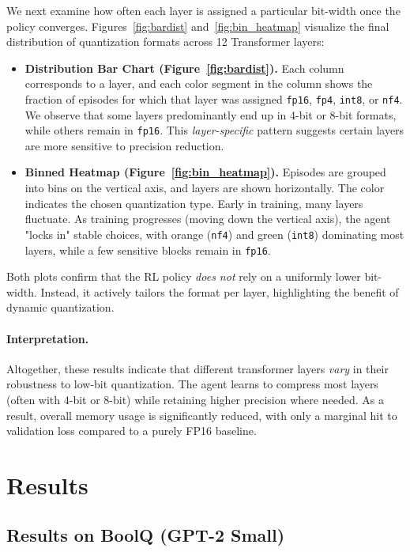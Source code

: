 \documentclass{article}
\begin{document}
	We next examine how often each layer is assigned a particular bit-width once the policy converges. Figures~\ref{fig:bardist} and~\ref{fig:bin_heatmap} visualize the final distribution of quantization formats across 12 Transformer layers:
	\begin{itemize}
		\item \textbf{Distribution Bar Chart (Figure~\ref{fig:bardist}).} Each column corresponds to a layer, and each color segment in the column shows the fraction of episodes for which that layer was assigned \texttt{fp16}, \texttt{fp4}, \texttt{int8}, or \texttt{nf4}. We observe that some layers predominantly end up in 4-bit or 8-bit formats, while others remain in \texttt{fp16}. This \emph{layer-specific} pattern suggests certain layers are more sensitive to precision reduction.
		\item \textbf{Binned Heatmap (Figure~\ref{fig:bin_heatmap}).} Episodes are grouped into bins on the vertical axis, and layers are shown horizontally. The color indicates the chosen quantization type. Early in training, many layers fluctuate. As training progresses (moving down the vertical axis), the agent "locks in" stable choices, with orange (\texttt{nf4}) and green (\texttt{int8}) dominating most layers, while a few sensitive blocks remain in \texttt{fp16}.
	\end{itemize}
	Both plots confirm that the RL policy \emph{does not} rely on a uniformly lower bit-width. Instead, it actively tailors the format per layer, highlighting the benefit of dynamic quantization.
	
	\paragraph{Interpretation.}
	Altogether, these results indicate that different transformer layers \emph{vary} in their robustness to low-bit quantization. The agent learns to compress most layers (often with 4-bit or 8-bit) while retaining higher precision where needed. As a result, overall memory usage is significantly reduced, with only a marginal hit to validation loss compared to a purely FP16 baseline.
			
	
	\section{Results}
	
	\subsection{Results on BoolQ (GPT-2 Small)}
	\label{sec:boolq-small}
	
\end{document}
